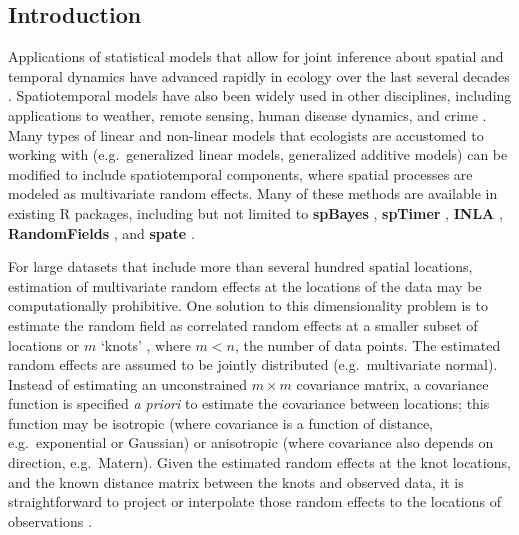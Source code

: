\documentclass[12pt,english]{article}
\begin{document}
\begin{spacing}{1.05}
\section{Introduction}

Applications of statistical models that allow for joint inference about spatial
and temporal dynamics have advanced rapidly in ecology over the last several
decades \citep{bascompte1995, latimer2009}. Spatiotemporal models have also
been widely used in other disciplines, including applications to weather,
remote sensing, human disease dynamics, and crime \citep{cressie2011}. Many
types of linear and non-linear models that ecologists are accustomed to working
with (e.g.~generalized linear models, generalized additive models) can be
modified to include spatiotemporal components, where spatial processes are
modeled as multivariate random effects. Many of these methods are available in
existing R packages, including but not limited to \textbf{spBayes}
\citep{finley2007}, \textbf{spTimer} \citep{bakar2015}, \textbf{INLA}
\citep{rue2009}, \textbf{RandomFields} \citep{schlather2016}, and
\textbf{spate} \citep{sigrist2015}.

For large datasets that include more than several hundred spatial locations,
estimation of multivariate random effects at the locations of the data may be
computationally prohibitive. One solution to this dimensionality problem is to
estimate the random field as correlated random effects at a smaller subset of
locations or $m$ `knots' \citep[e.g.][]{latimer2009, shelton2014}, where $m
  < n$, the number of data points. The estimated random effects are assumed to
be jointly distributed (e.g.~multivariate normal). Instead of estimating an
unconstrained $m \times m$ covariance matrix, a covariance function is
specified \emph{a priori} to estimate the covariance between locations; this
function may be isotropic (where covariance is a function of distance,
e.g.~exponential or Gaussian) or anisotropic (where covariance also depends on
direction, e.g.~Matern). Given the estimated random effects at the knot
locations, and the known distance matrix between the knots and observed data,
it is straightforward to project or interpolate those random effects to the
locations of observations \citep{latimer2009, finley2009}.


\end{spacing}
\end{document}
